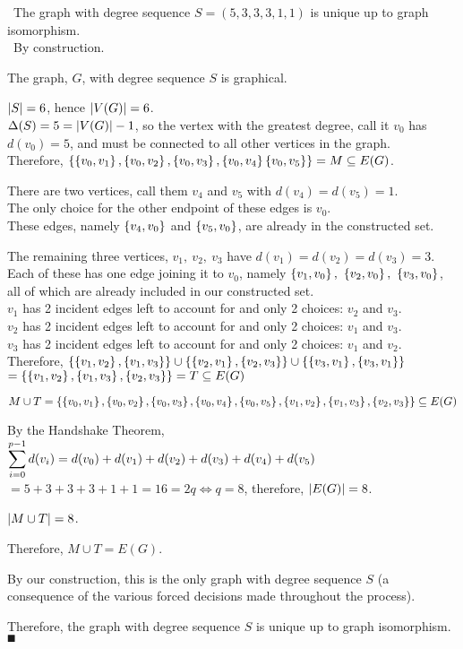 \documentclass[a4paper,11pt]{report}
\begin{document}
\Claim\ The graph with degree sequence $S=(5,3,3,3,1,1)$ is unique up to graph isomorphism. \\
\Proof\ By construction.
\begin{list}{}{\setlength{\leftmargin}{0.6in}\setlength{\topsep}{0pt}}\item 
  The graph, $G$, with degree sequence $S$ is graphical.

  $\left| S \right|=6$, hence $\left| V(G) \right|=6$. \\
  $\Delta(S)=5 = \left| V(G) \right|-1$, so the vertex with the greatest degree, call it $v_0$ has $d(v_0)=5$, and must be connected to all other vertices in the graph. \\
  Therefore, $\left\lbrace \left\lbrace v_0,v_1 \right\rbrace, \left\lbrace v_0,v_2 \right\rbrace, \left\lbrace v_0,v_3 \right\rbrace, \left\lbrace v_0,v_4 \right\rbrace\left\lbrace v_0,v_5 \right\rbrace \right\rbrace= M \subseteq E(G)$.

  There are two vertices, call them $v_4$ and $v_5$ with $d(v_4)=d(v_5)=1$. \\
  The only choice for the other endpoint of these edges is $v_0$. \\
  These edges, namely $\left\lbrace v_4,v_0 \right\rbrace$ and $\left\lbrace v_5,v_0 \right\rbrace$, are already in the constructed set.

  The remaining three vertices, $v_1,\ v_2,\ v_3$ have $d(v_1)=d(v_2)=d(v_3)=3$. \\
  Each of these has one edge joining it to $v_0$, namely $\braces{v_1,v_0},\ \braces{v_2,v_0},\ \braces{v_3,v_0}$, all of which are already included in our constructed set. \\
  $v_1$ has 2 incident edges left to account for and only 2 choices: $v_2$ and $v_3$. \\
  $v_2$ has 2 incident edges left to account for and only 2 choices: $v_1$ and $v_3$. \\
  $v_3$ has 2 incident edges left to account for and only 2 choices: $v_1$ and $v_2$. \\
  Therefore, $\left\lbrace \left\lbrace v_1,v_2 \right\rbrace,\left\lbrace v_1,v_3 \right\rbrace \right\rbrace\cup\left\lbrace \left\lbrace v_2,v_1 \right\rbrace,\left\lbrace v_2,v_3 \right\rbrace \right\rbrace\cup\left\lbrace \left\lbrace v_3,v_1 \right\rbrace,\left\lbrace v_3,v_1 \right\rbrace \right\rbrace$ \\ $= \left\lbrace \left\lbrace v_1,v_2 \right\rbrace,\left\lbrace v_1,v_3 \right\rbrace,\left\lbrace v_2,v_3 \right\rbrace \right\rbrace = T \subseteq E(G)$

  $M\cup T = \left\lbrace \left\lbrace v_0,v_1 \right\rbrace, \left\lbrace v_0,v_2 \right\rbrace, \left\lbrace v_0,v_3 \right\rbrace, \left\lbrace v_0,v_4 \right\rbrace, \left\lbrace v_0,v_5 \right\rbrace, \left\lbrace v_1,v_2 \right\rbrace, \left\lbrace v_1,v_3 \right\rbrace, \left\lbrace v_2,v_3 \right\rbrace \right\rbrace \subseteq E(G)$

  By the Handshake Theorem, $\displaystyle{\sum_{i=0}^{p-1}d(v_i) = d(v_0) + d(v_1) + d(v_2) + d(v_3) + d(v_4) + d(v_5)}$ \\ $= 5 + 3 + 3 + 3 + 1 + 1 = 16 = 2q\iff q=8$, therefore, $\left| E(G) \right|=8$.

  $\left| M \cup T \right| = 8$. 

  Therefore, $M\cup T = E(G)$.

  By our construction, this is the only graph with degree sequence $S$ (a consequence of the various forced decisions made throughout the process). \\
\end{list}
Therefore, the graph with degree sequence $S$ is unique up to graph isomorphism. $\QED$
\end{document}
